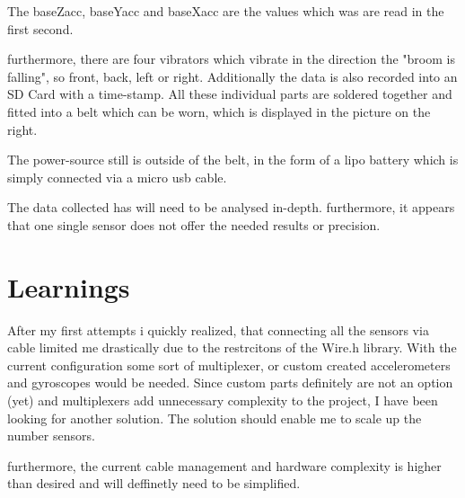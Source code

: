 The baseZacc, baseYacc and baseXacc are the values which was are read in the first second. 

furthermore, there are four vibrators  which vibrate in the direction the "broom is falling", so front, back, left or right. Additionally the data is also recorded into an SD Card with a time-stamp. All these individual parts are soldered together and fitted into a belt which can be worn, which is displayed in the picture on the right.

The power-source still is outside of the belt, in the form of a \gls{lipo battery} which is simply connected via a micro usb cable.

The data collected has will need to be analysed in-depth. furthermore, it appears that one single sensor does not offer the needed results or precision.

\section{Learnings}

After my first attempts i quickly realized, that connecting all the sensors via cable limited me drastically due to the restrcitons of the Wire.h library. With the current configuration some sort of multiplexer, or custom created accelerometers and gyroscopes would be needed. Since custom parts definitely are not an option (yet) and multiplexers add unnecessary complexity to the project, I have been looking for another solution. The solution should enable me to scale up the number sensors. 

furthermore, the current cable management and hardware complexity is higher than desired and will deffinetly need to be simplified.

